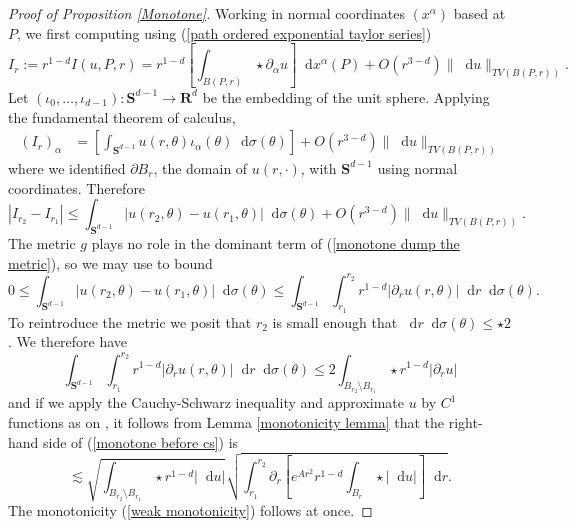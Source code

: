 \documentclass[reqno,11pt]{amsart}
\newcommand{\RR}{\mathbf{R}}
\newcommand{\Sph}{\mathbf S}
\newcommand*\dif{\mathop{}\!\mathrm{d}}
\theoremstyle{definition}
\numberwithin{equation}{section}
\begin{document}
\begin{proof}[Proof of Proposition \ref{Monotone}]
Working in normal coordinates $(x^\alpha)$ based at $P$, we first computing using (\ref{path ordered exponential taylor series})
$$I_r := r^{1 - d} I(u, P, r) = r^{1 - d} \left[\int_{B(P, r)} \star \partial_\alpha u\right] \dif x^\alpha(P) + O(r^{3 - d}) \|\dif u\|_{TV(B(P, r))}.$$
Let $(\iota_0, \dots, \iota_{d - 1}): \Sph^{d - 1} \to \RR^d$ be the embedding of the unit sphere.
Applying the fundamental theorem of calculus,
\begin{align*}
(I_r)_\alpha &= \left[\int_{\Sph^{d - 1}} u(r, \theta) \iota_\alpha(\theta) \dif \sigma(\theta)\right] + O(r^{3 - d}) \|\dif u\|_{TV(B(P, r))}
\end{align*}
where we identified $\partial B_r$, the domain of $u(r, \cdot)$, with $\Sph^{d - 1}$ using normal coordinates.
Therefore
\begin{equation}\label{monotone dump the metric}
|I_{r_2} - I_{r_1}| \leq \int_{\Sph^{d - 1}} |u(r_2, \theta) - u(r_1, \theta)| \dif \sigma(\theta) + O(r^{3 - d}) \|\dif u\|_{TV(B(P, r))}.
\end{equation}
The metric $g$ plays no role in the dominant term of (\ref{monotone dump the metric}), so we may use \cite[Lemma 5.3]{Giusti77} to bound
$$0 \leq \int_{\Sph^{d - 1}} |u(r_2, \theta) - u(r_1, \theta)| \dif \sigma(\theta) \leq \int_{\Sph^{d - 1}} \int_{r_1}^{r_2} r^{1 - d}|\partial_r u(r, \theta)| \dif r \dif\sigma(\theta).$$
To reintroduce the metric we posit that $r_2$ is small enough that $\dif r \dif \sigma(\theta) \leq \star 2$.
We therefore have
\begin{equation}\label{monotone before cs}
\int_{\Sph^{d - 1}} \int_{r_1}^{r_2} r^{1 - d}|\partial_r u(r, \theta)| \dif r \dif\sigma(\theta) \leq 2 \int_{B_{r_2} \setminus B_{r_1}} \star r^{1 - d}|\partial_r u|
\end{equation}
and if we apply the Cauchy-Schwarz inequality and approximate $u$ by $C^1$ functions as on \cite[pg68]{Giusti77}, it follows from Lemma \ref{monotonicity lemma} that the right-hand side of (\ref{monotone before cs}) is
$$\lesssim \sqrt{\int_{B_{r_2} \setminus B_{r_1}} \star r^{1 - d} |\dif u|} \sqrt{\int_{r_1}^{r_2} \partial_r \left[e^{Ar^2} r^{1-d}\int_{B_r} \star |\dif u|\right] \dif r}.$$
The monotonicity (\ref{weak monotonicity}) follows at once.


\end{proof}
\end{document}
